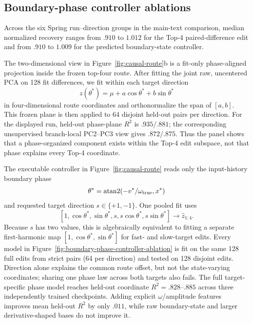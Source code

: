 \FloatBarrier

\subsection{Boundary-phase controller ablations}
\label{app:boundary-phase-controller}

Across the six Spring run--direction groups in the main-text comparison,
median normalized recovery ranges from $.910$ to $1.012$ for the Top-4
paired-difference edit and from $.910$ to $1.009$ for the predicted
boundary-state controller.

The two-dimensional view in Figure~\ref{fig:causal-route}b is a fit-only
phase-aligned projection inside the frozen top-four route. After fitting the
joint raw, uncentered PCA on 128 fit differences, we fit within each target
direction
\[
z(\theta^*)=\mu+a\cos\theta^*+b\sin\theta^*
\]
in four-dimensional route coordinates and orthonormalize the span of $[a,b]$.
This frozen plane is then applied to 64 disjoint held-out pairs per direction.
For the displayed run, held-out phase-plane $R^2$ is $.935/.881$; the
corresponding unsupervised branch-local PC2--PC3 view gives $.872/.875$.
Thus the panel shows that a phase-organized component exists within the Top-4
edit subspace, not that phase explains every Top-4 coordinate.

The executable controller in Figure~\ref{fig:causal-route} reads only the
input-history boundary phase
\[
\theta^*=\operatorname{atan2}(-v^*/\omega_{\rm true},x^*)
\]
and requested target direction $s\in\{+1,-1\}$. One pooled fit uses
\[
[1,\cos\theta^*,\sin\theta^*,s,
s\cos\theta^*,s\sin\theta^*]\rightarrow \hat z_{1:4}.
\]
Because $s$ has two values, this is algebraically equivalent to fitting a
separate first-harmonic map $[1,\cos\theta^*,\sin\theta^*]$ for fast- and
slow-target edits. Every model in
Figure~\ref{fig:boundary-phase-controller-ablation} is fit on the same 128
full edits from strict pairs (64 per direction) and tested on 128 disjoint edits.
Direction alone explains the common route offset, but not the state-varying
coordinates; sharing one phase law across both targets also fails. The full
target-specific phase model reaches held-out coordinate $R^2=.828$--$.885$
across three independently trained checkpoints. Adding explicit
$\omega$/amplitude features improves mean held-out $R^2$ by only $.011$, while
raw boundary-state and larger derivative-shaped bases do not improve it.

